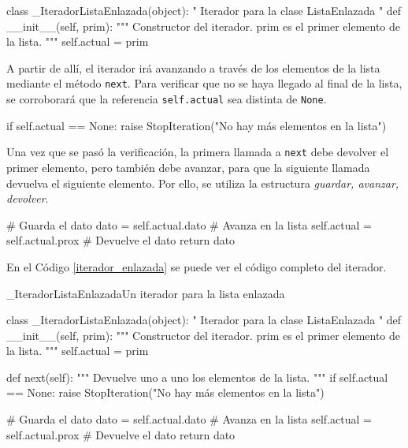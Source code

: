 \begin{codigo-python-sn}
class _IteradorListaEnlazada(object):
    " Iterador para la clase ListaEnlazada "
    def __init__(self, prim):
        """ Constructor del iterador.  
            prim es el primer elemento de la lista. """
        self.actual = prim
\end{codigo-python-sn}

A partir de allí, el iterador irá avanzando a través de los elementos de la
lista mediante el método \lstinline!next!.  Para verificar que no se haya
llegado al final de la lista, se corroborará que la referencia
\lstinline!self.actual! sea distinta de \lstinline!None!.

\begin{codigo-python-sn}
        if self.actual == None:
            raise StopIteration("No hay más elementos en la lista")
\end{codigo-python-sn}

Una vez que se pasó la verificación, la primera llamada a \lstinline!next!
debe devolver el primer elemento, pero también debe avanzar, para que la
siguiente llamada devuelva el siguiente elemento.  Por ello, se utiliza la
estructura {\it guardar, avanzar, devolver}.

\begin{codigo-python-sn}
        # Guarda el dato
        dato = self.actual.dato
        # Avanza en la lista
        self.actual = self.actual.prox
        # Devuelve el dato
        return dato
\end{codigo-python-sn}

En el Código \ref{iterador_enlazada} se puede ver el código completo del
iterador.

\begin{codigo}{\_IteradorListaEnlazada}{Un iterador para la lista enlazada}
\label{iterador_enlazada}
\begin{codigo-python}
class _IteradorListaEnlazada(object):
    " Iterador para la clase ListaEnlazada "
    def __init__(self, prim):
        """ Constructor del iterador.  
            prim es el primer elemento de la lista. """
        self.actual = prim

    def next(self):
        """ Devuelve uno a uno los elementos de la lista. """
        if self.actual == None:
            raise StopIteration("No hay más elementos en la lista")

        # Guarda el dato
        dato = self.actual.dato
        # Avanza en la lista
        self.actual = self.actual.prox
        # Devuelve el dato
        return dato
\end{codigo-python}
\end{codigo}

